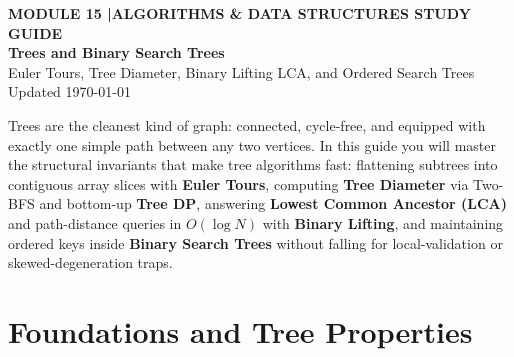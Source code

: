 \documentclass[11pt,a4paper]{article}
\newcommand{\sectionbreak}{}
\theoremstyle{definition}
\begin{document}
\thispagestyle{plain}
\begin{tcolorbox}[
    enhanced,
    colback=primaryblue!6, colframe=primaryblue!20,
    borderline west={5pt}{0pt}{primaryblue},
    arc=4pt, boxrule=0.6pt,
    left=14pt, right=14pt, top=7pt, bottom=7pt,
    before skip=0pt, after skip=5pt
]
    {\footnotesize\bfseries\color{accentteal}MODULE 15 \quad|\quad ALGORITHMS \& DATA STRUCTURES STUDY GUIDE}\\[3pt]
    {\Huge\bfseries\color{primaryblue}Trees and Binary Search Trees}\\[3pt]
    {\large\color{codegray}Euler Tours, Tree Diameter, Binary Lifting LCA, and Ordered Search Trees}\\[4pt]
    {\footnotesize\color{codegray}Updated \today}
\end{tcolorbox}

\begin{overviewbox}
\small
Trees are the cleanest kind of graph: connected, cycle-free, and equipped with exactly one simple path between any two vertices. In this guide you will master the structural invariants that make tree algorithms fast: flattening subtrees into contiguous array slices with \textbf{Euler Tours}, computing \textbf{Tree Diameter} via Two-BFS and bottom-up \textbf{Tree DP}, answering \textbf{Lowest Common Ancestor (LCA)} and path-distance queries in $O(\log N)$ with \textbf{Binary Lifting}, and maintaining ordered keys inside \textbf{Binary Search Trees} without falling for local-validation or skewed-degeneration traps.
\end{overviewbox}

\vspace{-6pt}
{\setlength{\parskip}{0pt}\let\oldaddvspace\addvspace\renewcommand{\addvspace}[1]{\oldaddvspace{0.18em plus 1pt}}\titlespacing*{\section}{0pt}{2pt}{6pt}\footnotesize\tableofcontents}

\renewcommand{\sectionbreak}{\clearpage}

\section{Foundations and Tree Properties}
\label{sec:foundations}
\end{document}
